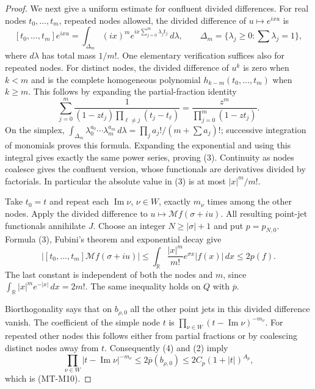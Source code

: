 \begin{proof}
We next give a uniform estimate for confluent divided differences.
For real nodes $t_0,\ldots,t_m$, repeated nodes allowed, the
divided difference of $u\mapsto e^{ixu}$ is
\[
 [t_0,\ldots,t_m]e^{ixu}
   =\int_{\Delta_m}(ix)^m
           e^{ix\sum_{j=0}^m\lambda_jt_j}\,d\lambda,
 \qquad
 \Delta_m=\{\lambda_j\ge0:\textstyle\sum\lambda_j=1\},
                                                        \tag{3}
\]
where $d\lambda$ has total mass $1/m!$.
One elementary verification suffices also for repeated nodes.
For distinct nodes, the divided difference of $u^k$ is zero
when $k<m$ and is the complete homogeneous polynomial
$h_{k-m}(t_0,\ldots,t_m)$ when $k\ge m$. This follows by
expanding the partial-fraction identity
\[
 \sum_{j=0}^m
 \frac{1}{(1-zt_j)\prod_{\ell\ne j}(t_j-t_\ell)}
          =\frac{z^m}{\prod_{j=0}^m(1-zt_j)}.
\]
On the simplex,
$\int_{\Delta_m}\lambda_0^{a_0}\cdots\lambda_m^{a_m}\,d\lambda
=\prod_j a_j!/(m+\sum a_j)!$; successive integration of
monomials proves this formula. Expanding the exponential and
using this integral gives exactly the same power series,
proving (3). Continuity as nodes coalesce gives the confluent
version, whose functionals are derivatives divided by factorials.
In particular the absolute value in (3) is at most $|x|^m/m!$.

Take $t_0=t$ and repeat each $\operatorname{Im}\nu$, $\nu\in W$,
exactly $m_\nu$ times among the other nodes. Apply the divided
difference to $u\mapsto\mathcal Mf(\sigma+iu)$.
All resulting point-jet functionals annihilate $J$.
Choose an integer $N\ge|\sigma|+1$ and put $p=p_{N,0}$.
Formula (3), Fubini's theorem and exponential decay give
\[
 \left|[t_0,\ldots,t_m]\mathcal Mf(\sigma+iu)\right|
 \le\int_{\mathbb R}\frac{|x|^m}{m!}e^{\sigma x}|f(x)|\,dx
 \le2p(f).                                             \tag{4}
\]
The last constant is independent of both the nodes and $m$,
since $\int_{\mathbb R}|x|^m e^{-|x|}\,dx=2m!$.
The same inequality holds on $Q$ with $\overline p$.

Biorthogonality says that on $b_{\rho,0}$ all the other
point jets in this divided difference vanish. The coefficient
of the simple node $t$ is
$\prod_{\nu\in W}(t-\operatorname{Im}\nu)^{-m_\nu}$.
For repeated other nodes this follows either from partial
fractions or by coalescing distinct nodes away from $t$.
Consequently (4) and (2) imply
\[
 \prod_{\nu\in W}|t-\operatorname{Im}\nu|^{-m_\nu}
       \le2\overline p(b_{\rho,0})
       \le2C_p(1+|t|)^{A_p},
\]
which is (MT-M10).
\end{proof}

